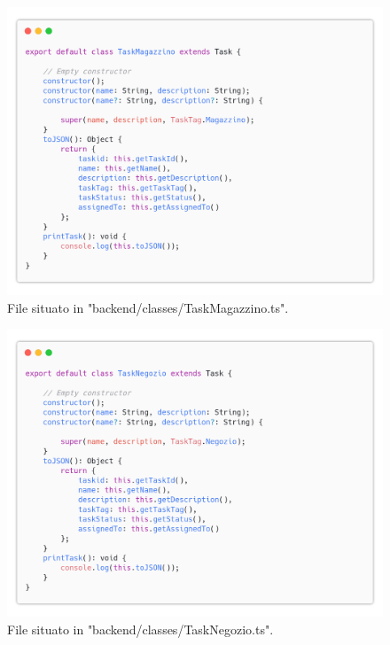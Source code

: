 \documentclass{report}
\begin{document}
\begin{figure}[H]
	\centering\includegraphics[width=1\textwidth]{images/code_task_magazzino.png}
	File situato in "backend/classes/TaskMagazzino.ts".
\end{figure}

\begin{figure}[H]
	\centering\includegraphics[width=1\textwidth]{images/code_task_negozio.png}
	File situato in "backend/classes/TaskNegozio.ts".
\end{figure}
\end{document}
